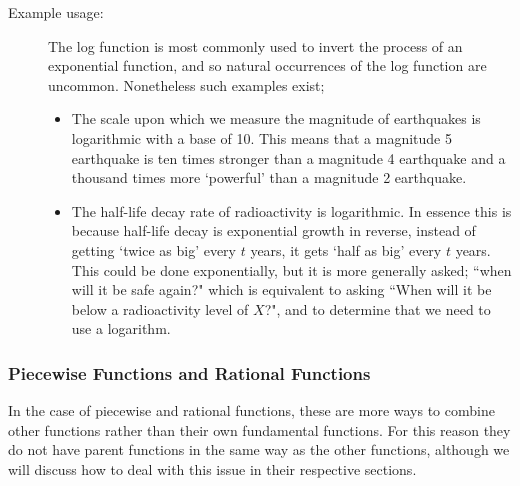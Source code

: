 \documentclass{ximeraXloud}
\begin{document}
\begin{description}
            \item[Example usage:] The log function is most commonly used to invert the process of an exponential function, and so natural occurrences of the log function are uncommon. Nonetheless such examples exist;
            \begin{itemize}
                \item The scale upon which we measure the magnitude of earthquakes is logarithmic with a base of 10. This means that a magnitude 5 earthquake is ten times stronger than a magnitude 4 earthquake and a thousand times more `powerful' than a magnitude 2 earthquake.
                \item The half-life decay rate of radioactivity is logarithmic. In essence this is because half-life decay is exponential growth in reverse, instead of getting `twice as big' every $t$ years, it gets `half as big' every $t$ years. This could be done exponentially, but it is more generally asked; ``when will it be safe again?" which is equivalent to asking ``When will it be below a radioactivity level of $X$?", and to determine that we need to use a logarithm.
            \end{itemize}
        \end{description}

    \subsubsection*{Piecewise Functions and Rational Functions}
        In the case of piecewise and rational functions, these are more ways to combine other functions rather than their own fundamental functions. For this reason they do not have parent functions in the same way as the other functions, although we will discuss how to deal with this issue in their respective sections.
\end{document}
